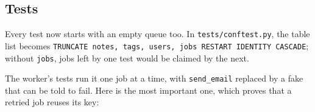 \subsection*{Tests}\label{41-event-driven-architecture:tests}

Every test now starts with an empty queue too. In \texttt{tests/conftest.py}, the table list becomes \texttt{TRUNCATE\ notes,}\allowbreak{}\texttt{\ tags,}\allowbreak{}\texttt{\ users,}\allowbreak{}\texttt{\ jobs\ RESTART\ IDENTITY\ CASCADE}; without \texttt{jobs}, jobs left by one test would be claimed by the next.

The worker's tests run it one job at a time, with \texttt{send\_email} replaced by a fake that can be told to fail. Here is the most important one, which proves that a retried job reuses its key:

